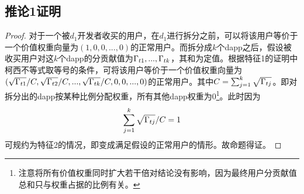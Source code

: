 \subsection{推论1证明}
\label{subsection:proof3}
\begin{proof}
	对于一个被$d_1$开发者收买的用户，在$d_1$进行拆分之前，可以将该用户等价于一个价值权重向量为$(1,0,0,...,0)$的正常用户。而拆分成$k$个dapp之后，假设被收买用户对这$k$个dapp的分贡献值为$\Gamma_{t1},...,\Gamma_{tk}$，其和为定值。根据特征1的证明中柯西不等式取等号的条件，可将该用户等价于一个价值权重向量为$(\sqrt{\Gamma_{t1}}/C,\sqrt{\Gamma_{t2}}/C,...,\sqrt{\Gamma_{tk}}/C,0,0,...,0)$的正常用户。其中$C=\sum_{j=1}^k \sqrt{\Gamma_{tj}}$。即对拆分出的dapp按某种比例分配权重，所有其他dapp权重为0\footnote{注意将所有价值权重同时扩大若干倍对结论没有影响，因为最终用户分贡献值总和只与权重占据的比例有关。}。此时因为
	$$\sum_{j=1}^k \sqrt{\Gamma_{tj}}/C =1$$
	可规约为特征2的情况，即变成满足假设的正常用户的情形。故命题得证。
\end{proof}
